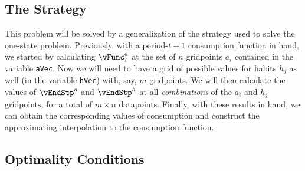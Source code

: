 \documentclass[\econtexRoot/SolvingMicroDSOPs]{subfiles}
\begin{document}
\hypertarget{The-Strategy}{}
\subsection{The Strategy}

This problem will be solved by a generalization of the strategy used
to solve the one-state problem.  Previously, with a period-$t+1$
consumption function in hand, we started by calculating
$\vFunc^{a}_{i}$ at the set of $n$ gridpoints $a_{i}$
contained in the variable \texttt{aVec}.  Now we will need to
have a grid of possible values for habits $h_{j}$ as well (in the
variable \texttt{hVec}) with, say, $m$ gridpoints.  We will then
calculate the values of $\vEndStp^{a}$ and $\vEndStp^{h}$
at all \textit{combinations} of the $a_{i}$ and $h_{j}$
gridpoints, for a total of $m \times n$ datapoints.  Finally, with
these results in hand, we can obtain the corresponding values of
consumption and construct the approximating interpolation to the
consumption function.

\hypertarget{Optimality-Conditions}{}
\subsection{Optimality Conditions}
\hypertarget{The-First-Orrder-Condition-for-c}{}
\end{document}
